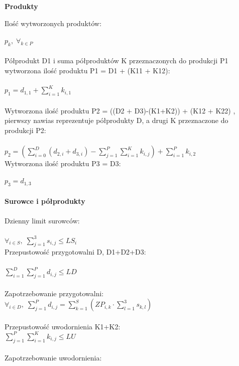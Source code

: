 \documentclass[a4paper, 10pt]{article}
\begin{document}
{\bf Produkty\\}

Ilość wytworzonych produktów:\\ \hfill\\
$p_{k}  , \; \forall_{k \in P}$ \\
\hfill\\ 
Półprodukt D1 i suma półproduktów K przeznaczonych do produkcji P1  wytworzona ilość produktu P1 = D1 + (K11 + K12):\\ \hfill \\
$p_1 = d_{1,1} + \sum_{i=1}^{K} k_{i,1} $  \\ \hfill\\


Wytworzona ilość produktu P2 = ((D2 + D3)-(K1+K2)) + (K12 + K22) , pierwszy nawias reprezentuje półprodukty D, 
a drugi K przeznaczone do produkcji P2:\\ \hfill\\
 $p_2 =  (\sum_{i=0}^{D} (d_{2,i} + d_{3,i}) -  \sum_{j=1}^{P}  \sum_{i=1}^{K} k_{i,j}) +   \sum_{i=1}^{P} k_{i,2}  $\\ 
 

Wytworzona ilość produktu P3 = D3:\\ \hfill\\
 $p_3 = d_{1,3} $ \\
\hfill\\

{\bf Surowce i półprodukty\\}
\hfill \\ 

Dzienny limit surowców:\\ \hfill\\
$\forall_{i \in S},\; \sum_{j=1}^{3}s_{i,j} \le  LS_i$ \\ 


Przepustowość przygotowalni D, D1+D2+D3: \\ \hfill\\
$\sum_{i=1}^{D}\sum_{j=1}^{P}  d_{i,j} \le  LD$ \\
\hfill\\
Zapotrzebowanie przygotowalni:\\   

$\forall_{i \in D},\; \sum_{j=1}^{P} d_{i,j} = \sum_{k=1}^{S} (ZP_{i,k} \cdot \sum_{l=1}^{3}s_{k,l}) $\\
\hfill\\
Przepustowość uwodornienia K1+K2:\\ 

$\sum_{j=1}^{P}  \sum_{i=1}^{K} k_{i,j} \le  LU$\\
\hfill\\
Zapotrzebowanie uwodornienia:\\  
\end{document}
